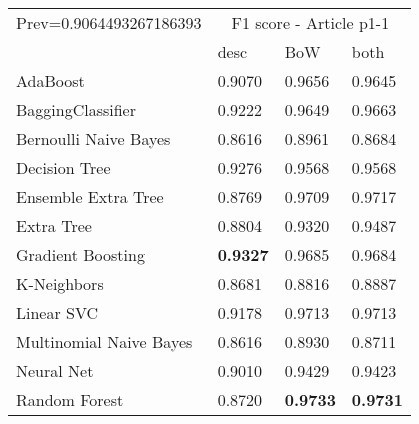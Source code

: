 \begin{tabular}{|l|l|l|l| }
\hline
Prev=0.9064493267186393 &  \multicolumn{3}{c|}{F1 score - Article p1-1} \\
\cline{2-4} & desc & BoW & both \\ \hline
AdaBoost                & 0.9070 & 0.9656 & 0.9645\\
BaggingClassifier       & 0.9222 & 0.9649 & 0.9663\\
Bernoulli Naive Bayes   & 0.8616 & 0.8961 & 0.8684\\
Decision Tree           & 0.9276 & 0.9568 & 0.9568\\
Ensemble Extra Tree     & 0.8769 & 0.9709 & 0.9717\\
Extra Tree              & 0.8804 & 0.9320 & 0.9487\\
Gradient Boosting       & {\bf 0.9327} & 0.9685 & 0.9684\\
K-Neighbors             & 0.8681 & 0.8816 & 0.8887\\
Linear SVC              & 0.9178 & 0.9713 & 0.9713\\
Multinomial Naive Bayes & 0.8616 & 0.8930 & 0.8711\\
Neural Net              & 0.9010 & 0.9429 & 0.9423\\
Random Forest           & 0.8720 & {\bf 0.9733} & {\bf 0.9731}\\
\hline
\end{tabular}